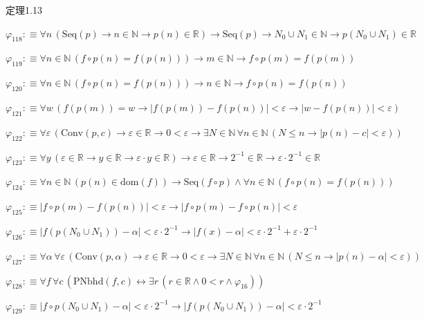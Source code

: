 \begin{fullproof}{定理1.13}
\begin{abbrevlist}
\item $\varphi_{118} :\equiv \forall n\,(\mathrm{Seq}(p) \to n \in \mathbb{N} \to p(n) \in \mathbb{R}) \to \mathrm{Seq}(p) \to N_{0} \cup N_{1} \in \mathbb{N} \to p(N_{0} \cup N_{1}) \in \mathbb{R}$
\item $\varphi_{119} :\equiv \forall n \in \mathbb{N}\,(f \circ p(n) = f(p(n))) \to m \in \mathbb{N} \to f \circ p(m) = f(p(m))$
\item $\varphi_{120} :\equiv \forall n \in \mathbb{N}\,(f \circ p(n) = f(p(n))) \to n \in \mathbb{N} \to f \circ p(n) = f(p(n))$
\item $\varphi_{121} :\equiv \forall w\,(f(p(m)) = w \to \lvert f(p(m)) - f(p(n)) \rvert < \varepsilon \to \lvert w - f(p(n)) \rvert < \varepsilon)$
\item $\varphi_{122} :\equiv \forall \varepsilon\,(\mathrm{Conv}(p,c) \to \varepsilon \in \mathbb{R} \to 0 < \varepsilon \to \exists N \in \mathbb{N}\,\forall n \in \mathbb{N}\,(N \leq n \to \lvert p(n) - c \rvert < \varepsilon))$
\item $\varphi_{123} :\equiv \forall y\,(\varepsilon \in \mathbb{R} \to y \in \mathbb{R} \to \varepsilon \cdot y \in \mathbb{R}) \to \varepsilon \in \mathbb{R} \to 2^{-1} \in \mathbb{R} \to \varepsilon \cdot 2^{-1} \in \mathbb{R}$
\item $\varphi_{124} :\equiv \forall n \in \mathbb{N}\,(p(n) \in \mathrm{dom}(f)) \to \mathrm{Seq}(f \circ p) \land \forall n \in \mathbb{N}\,(f \circ p(n) = f(p(n)))$
\item $\varphi_{125} :\equiv \lvert f \circ p(m) - f(p(n)) \rvert < \varepsilon \to \lvert f \circ p(m) - f \circ p(n) \rvert < \varepsilon$
\item $\varphi_{126} :\equiv \lvert f(p(N_{0} \cup N_{1})) - \alpha \rvert < \varepsilon \cdot 2^{-1} \to \lvert f(x) - \alpha \rvert < \varepsilon \cdot 2^{-1} + \varepsilon \cdot 2^{-1}$
\item $\varphi_{127} :\equiv \forall \alpha\,\forall \varepsilon\,(\mathrm{Conv}(p,\alpha) \to \varepsilon \in \mathbb{R} \to 0 < \varepsilon \to \exists N \in \mathbb{N}\,\forall n \in \mathbb{N}\,(N \leq n \to \lvert p(n) - \alpha \rvert < \varepsilon))$
\item $\varphi_{128} :\equiv \forall f\,\forall c\,(\mathrm{PNbhd}(f,c) \leftrightarrow \exists r\,(r \in \mathbb{R} \land 0 < r \land \varphi_{16}))$
\item $\varphi_{129} :\equiv \lvert f \circ p(N_{0} \cup N_{1}) - \alpha \rvert < \varepsilon \cdot 2^{-1} \to \lvert f(p(N_{0} \cup N_{1})) - \alpha \rvert < \varepsilon \cdot 2^{-1}$

\end{abbrevlist}
\end{fullproof}
